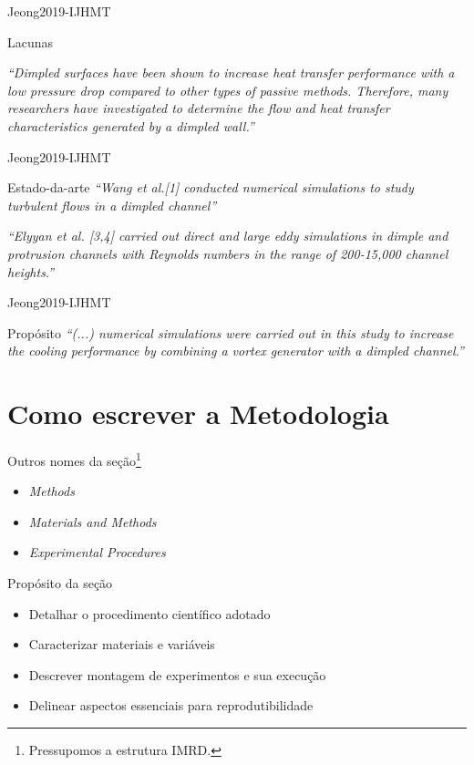 \begin{frame}{Jeong2019-IJHMT} 
\begin{block}{Lacunas}

\emph{``Dimpled surfaces have been shown to increase heat transfer performance with a low pressure drop compared to other types of passive methods. Therefore, many researchers have investigated to determine the flow and heat transfer characteristics generated by a dimpled wall.''} 
\end{block}
\end{frame}

\begin{frame}{Jeong2019-IJHMT} 
\begin{block}{Estado-da-arte}
\emph{``Wang et al.[1] conducted numerical simulations to study turbulent flows in a dimpled channel''} 

\emph{``Elyyan et al. [3,4] carried out direct and large eddy simulations in dimple and protrusion channels with Reynolds numbers in the range of 200-15,000   channel heights.''} 
\end{block}
\end{frame}

\begin{frame}{Jeong2019-IJHMT} 
\begin{block}{Propósito}
\emph{``(...) numerical simulations were carried out in this study to increase the cooling performance by combining a vortex generator with a dimpled channel.''}  
\end{block}
\end{frame}

\section{Como escrever a Metodologia}

\begin{frame}{Outros nomes da seção\footnote{Pressupomos a estrutura IMRD.}}
\begin{itemize}
\item \emph{Methods}
\item \emph{Materials and Methods}
\item \emph{Experimental Procedures}
\end{itemize}
\end{frame}

\begin{frame}{Propósito da seção}
\begin{itemize}
\item Detalhar o procedimento científico adotado
\item Caracterizar materiais e variáveis 
\item Descrever montagem de experimentos e sua execução 
\item Delinear aspectos essenciais para reprodutibilidade
\end{itemize}
\end{frame}

